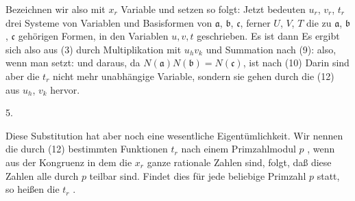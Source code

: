 Bezeichnen wir also mit $x_r$ Variable und setzen
so folgt:
Jetzt bedeuten $u_r$, $v_r$, $t_r$ drei Systeme von Variablen und
Basisformen von $\mathfrak{a}$, $\mathfrak{b}$, $\mathfrak{c}$, ferner $U$, $V$, $T$ die zu $\mathfrak{a}$, $\mathfrak{b}$, $\mathfrak{c}$ gehörigen Formen, in den Variablen $u,v,t$ geschrieben. Es ist dann
Es ergibt sich also aus (3) durch Multiplikation mit $u_h v_k$ und Summation nach (9):
also, wenn man
setzt:
und daraus, da $N(\mathfrak{a})N(\mathfrak{b}) = N(\mathfrak{c})$, ist nach (10)
Darin sind aber die $t_r$ nicht mehr unabhängige Variable, sondern sie gehen durch die  (12) aus $u_h$, $v_k$ hervor.

5. 

Diese Substitution hat aber noch eine wesentliche Eigentümlichkeit. Wir nennen die durch (12) bestimmten Funktionen $t_r$ nach einem Primzahlmodul $p$ , wenn aus der Kongruenz
in dem die $x_r$ ganze rationale Zahlen sind, folgt, daß diese Zahlen alle durch $p$ teilbar sind. Findet dies für jede beliebige Primzahl $p$ statt, so heißen die $t_r$ .
